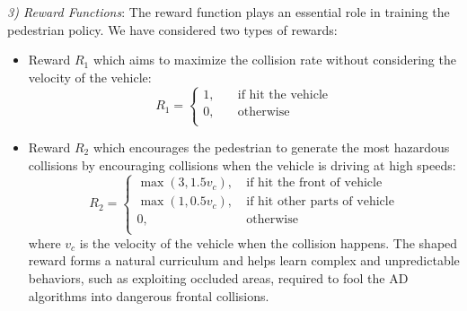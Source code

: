 \documentclass[letterpaper, 10 pt, conference]{ieeeconf}
\newcommand{\Rs}{R_1}
\newcommand{\Rc}{R_2}
\begin{document}
\textit{3) Reward Functions}: The reward function plays an essential role in training the pedestrian policy.
We have considered two types of rewards:
\begin{itemize}
\item Reward $\Rs$ which aims to maximize the collision rate without considering the velocity of the vehicle:
\begin{equation*}
    \Rs = \left\{
    \begin{aligned}
        1, & \quad\text{if hit the vehicle} \\
        0, & \quad\text{otherwise} \\
    \end{aligned}
    \right.
\label{reward_function:constant}
\end{equation*}

\item Reward $\Rc$  which encourages the pedestrian to generate the most hazardous collisions by encouraging collisions when the vehicle is driving at high speeds:
\begin{equation*}
\Rc = \left\{
    \begin{aligned}
        \max(3, 1.5 v_c),& \ \text{if hit the front of vehicle} \\
        \max(1, 0.5 v_c),& \ \text{if hit other parts of vehicle} \\
        0, & \ \text{otherwise} \\
    \end{aligned}
    \right.
\label{reward_function:combinational}
\end{equation*}
where $v_c$ is the velocity of the vehicle when the collision happens. The shaped reward forms a natural curriculum and helps learn complex and unpredictable behaviors, such as exploiting occluded areas, required to fool the AD algorithms into dangerous frontal collisions.  

\end{itemize}
\end{document}
